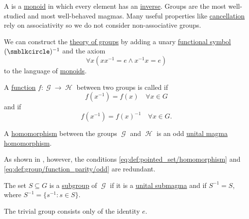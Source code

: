 \begin{definition}\label{def:group}
  A  is a \hyperref[def:unital_magma/associative]{monoid} in which every element has an \hyperref[def:unital_magma_inverse_element]{inverse}. Groups are the most well-studied and most well-behaved magmas. Many useful properties like \hyperref[thm:group_properties/cancellative]{cancellation} rely on associativity so we do not consider non-associative groups.

  \begin{thmenum}
     We can construct the \hyperref[def:first_order_theory]{theory of groups} by adding a unary \hyperref[def:first_order_language/func]{functional symbol} \( (\placeholder)^{-1} \) and the axiom
    \begin{equation}\label{eq:def:group/theory/inverse_axiom}
      \forall x (xx^{-1} = e \wedge x^{-1}x = e)
    \end{equation}
    to the language of \hyperref[def:unital_magma/associative]{monoids}.

     A \hyperref[def:function/single_valued]{function} \( f: \mscrG \to \mscrH \) between two groups is called  if
    \begin{equation}\label{eq:def:group/function_parity/even}
      f(x^{-1}) = f(x) \quad\forall x \in G
    \end{equation}
    and  if
    \begin{equation}\label{eq:def:group/function_parity/odd}
      f(x^{-1}) = f(x)^{-1} \quad\forall x \in G.
    \end{equation}

     A \hyperref[def:first_order_homomorphism]{homomorphism} between the groups \( \mscrG \) and \( \mscrH \) is an odd \hyperref[def:unital_magma/homomorphism]{unital magma homomorphism}.

    As shown in , however, the conditions \eqref{eq:def:pointed_set/homomorphism} and \eqref{eq:def:group/function_parity/odd} are redundant.

     The set \( S \subseteq G \) is a \hyperref[def:first_order_substructure]{subgroup} of \( \mscrG \) if it is a \hyperref[def:unital_magma/substructure]{unital submagma} and if \( S^{-1} = S \), where \( S^{-1} = \{ s^{-1} \colon s \in S \} \).

     The trivial group consists only of the identity \( e \).


\end{thmenum}
\end{definition}
